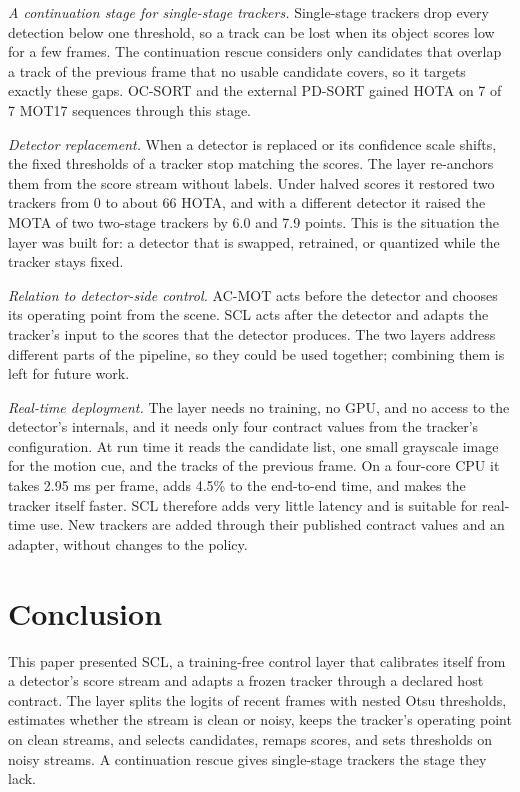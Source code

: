 \documentclass[pdflatex,sn-mathphys-num,iicol]{sn-jnl}
\newcommand{\scl}{SCL}
\begin{document}
\emph{A continuation stage for single-stage trackers.} Single-stage trackers
drop every detection below one threshold, so a track can be lost when its
object scores low for a few frames. The continuation rescue considers only
candidates that overlap a track of the previous frame that no usable candidate
covers, so it targets exactly these gaps. OC-SORT and the external PD-SORT
gained HOTA on 7 of 7 MOT17 sequences through this stage.

\emph{Detector replacement.} When a detector is replaced or its confidence
scale shifts, the fixed thresholds of a tracker stop matching the scores. The
layer re-anchors them from the score stream without labels. Under halved
scores it restored two trackers from 0 to about 66 HOTA, and with a different
detector it raised the MOTA of two two-stage trackers by 6.0 and 7.9 points.
This is the situation the layer was built for: a detector that is swapped,
retrained, or quantized while the tracker stays fixed.

\emph{Relation to detector-side control.} AC-MOT \cite{ismail2026acmot}
acts before the detector and chooses its operating point from the scene.
\scl{} acts after the detector and adapts the tracker's input to the scores
that the detector produces. The two layers address different parts of the
pipeline, so they could be used together; combining them is left for future
work.

\emph{Real-time deployment.} The layer needs no training, no GPU, and no
access to the detector's internals, and it needs only four contract values
from the tracker's configuration. At run time it reads the candidate list, one
small grayscale image for the motion cue, and the tracks of the previous
frame. On a four-core CPU it takes 2.95 ms per frame, adds 4.5\% to the end-to-end time, and makes the tracker
itself faster. \scl{} therefore adds very little latency and is
suitable for real-time use. New trackers are added through their published
contract values and an adapter, without changes to the policy.
\section{Conclusion}\label{sec:conclusion}

This paper presented \scl{}, a training-free control layer that calibrates itself
from a detector's score stream and adapts a frozen tracker through a declared
host contract. The layer splits the logits of recent frames with nested Otsu
thresholds, estimates whether the stream is clean or noisy, keeps the
tracker's operating point on clean streams, and selects candidates, remaps
scores, and sets thresholds on noisy streams. A continuation rescue gives
single-stage trackers the stage they lack.
\end{document}
